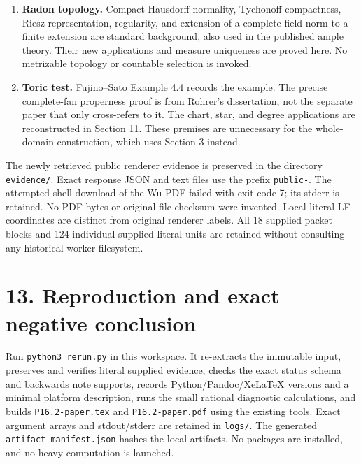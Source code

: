 \documentclass[
  10pt,
]{article}
\begin{document}
\begin{enumerate}
  \textbf{Actual continuous products.} BE v3 7.14 and 8.3--8.6, 8.18,
  and BJ Remark 7.23 supply continuous actual-metric compatibility and
  raw fundamental-cycle products. CLD v2 18.1.2 and 8.8.5 supply literal
  frame and zero-Hessian identities at continuous stages. CLD 8.7.2 is a
  uniform-convergence statement; it is not a bounded discontinuous or
  unbounded local bridge. The noncontinuous parts proved here use G0
  decreasing and weighted convergence; the missing category comparison
  is labeled L.
\item
  \textbf{Radon topology.} Compact Hausdorff normality, Tychonoff
  compactness, Riesz representation, regularity, and extension of a
  complete-field norm to a finite extension are standard background,
  also used in the published ample theory. Their new applications and
  measure uniqueness are proved here. No metrizable topology or
  countable selection is invoked.
\item
  \textbf{Toric test.} Fujino--Sato Example 4.4 records the example. The
  precise complete-fan properness proof is from Rohrer's dissertation,
  not the separate paper that only cross-refers to it. The chart, star,
  and degree applications are reconstructed in Section 11. These
  premises are unnecessary for the whole-domain construction, which uses
  Section 3 instead.
\end{enumerate}

The newly retrieved public renderer evidence is preserved in the
directory \texttt{evidence/}. Exact response JSON and text files use the
prefix \texttt{public-}. The attempted shell download of the Wu PDF
failed with exit code 7; its stderr is retained. No PDF bytes or
original-file checksum were invented. Local literal LF coordinates are
distinct from original renderer labels. All 18 supplied packet blocks
and 124 individual supplied literal units are retained without
consulting any historical worker filesystem.

\section{13. Reproduction and exact negative
conclusion}\label{reproduction-and-exact-negative-conclusion}

Run \texttt{python3\ rerun.py} in this workspace. It re-extracts the
immutable input, preserves and verifies literal supplied evidence,
checks the exact status schema and backwards note supports, records
Python/Pandoc/XeLaTeX versions and a minimal platform description, runs
the small rational diagnostic calculations, and builds
\texttt{P16.2-paper.tex} and \texttt{P16.2-paper.pdf} using the existing
tools. Exact argument arrays and stdout/stderr are retained in
\texttt{logs/}. The generated \texttt{artifact-manifest.json} hashes the
local artifacts. No packages are installed, and no heavy computation is
launched.
\end{document}
